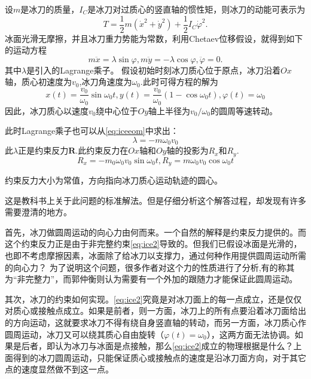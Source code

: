 \documentclass{ctexart}
\begin{document}
设$m$是冰刀的质量，$I_C$是冰刀对过质心的竖直轴的惯性矩，则冰刀的动能可表示为
\begin{equation}
  \label{eq:ice3}
  T = \frac{1}{2}m\left(\dot{x}^2+\dot{y}^2\right)+\frac{1}{2}I_C\dot{\varphi}^2.
\end{equation}
冰面光滑无摩擦，并且冰刀重力势能为常数，利用Chetaev位移假设，就得到如下的运动方程
\begin{equation}
  \label{eq:iceeom}
  m \ddot{x} = \lambda \sin\varphi, m \ddot{y} = -\lambda \cos\varphi, \ddot{\varphi} = 0.
\end{equation}
其中$\lambda$是引入的Lagrange乘子。
假设初始时刻冰刀质心位于原点，冰刀沿着$Ox$轴，质心初速度为$v_0$,冰刀角速度为$\omega_0$.此时可得方程的解为
\begin{equation}
  \label{eq:icesol}
  x(t) = \frac{v_0}{\omega_0}\sin\omega_0t, y(t) = \frac{v_0}{\omega_0}(1 - \cos\omega_0t), \varphi(t) = \omega_0
\end{equation}
因此，冰刀质心以速度$v_0$绕中心位于$Oy$轴上半径为$v_0/\omega_0$的圆周等速转动。

此时Lagrange乘子也可以从\eqref{eq:iceeom}中求出：
\begin{equation}
  \label{eq:icel}
 \lambda = -m\omega_0v_0
\end{equation}
此$\lambda$正是约束反力$\mathbf{R}$.此约束反力在$Ox$轴和$Oy$轴的投影为$R_x$和$R_y$.
\begin{equation}
  \label{eq:icecon}
  R_x = -m_0\omega_0v_0\sin\omega_0t, R_y = m \omega_0v_0\cos\omega_0t
\end{equation}

约束反力大小为常值，方向指向冰刀质心运动轨迹的圆心。

这是教科书上关于此问题的标准解法。但是仔细分析这个解答过程，却发现有许多需要澄清的地方。

首先，冰刀做圆周运动的向心力由何而来。一个自然的解释是约束反力提供的。而这个约束反力正是由于非完整约束\eqref{eq:ice2}导致的。但我们已假设冰面是光滑的，也即不考虑摩擦因素，冰面除了给冰刀以支撑力，通过何种作用提供圆周运动所需的向心力？
为了说明这个问题，很多作者对这个力的性质进行了分析,有的称其为“非完整力”，而郭仲衡则认为需要有一个外加的跟随力才能保证此圆周运动。

其次，冰刀的约束如何实现。\eqref{eq:ice2}究竟是对冰刀面上的每一点成立，还是仅仅对质心或接触点成立。如果是前者，则一方面，冰刀上的所有点要沿着冰刀面给出的方向运动，这就要求冰刀不得有绕自身竖直轴的转动，而另一方面，冰刀质心作圆周运动，冰刀又可以绕其质心自由旋转（$\varphi(t)=\omega_0$），这两方面无法协调。如果是后者，即认为冰刀与冰面是点接触，那么\eqref{eq:ice2}成立的物理根据是什么？上面得到的冰刀圆周运动，只能保证质心或接触点的速度是沿冰刀面方向，对于其它点的速度显然做不到这一点。
\end{document}
